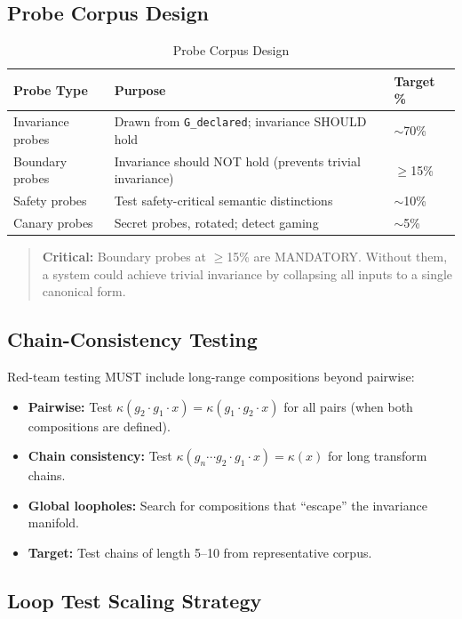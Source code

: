 \documentclass[11pt,letterpaper]{article}
\theoremstyle{definition}
\theoremstyle{remark}
\begin{document}
\subsection{Probe Corpus Design}

\begin{table}[h]
\centering
\begin{tabular}{@{}lll@{}}
\toprule
\textbf{Probe Type} & \textbf{Purpose} & \textbf{Target \%} \\
\midrule
Invariance probes & Drawn from \texttt{G\_declared}; invariance SHOULD hold & $\sim$70\% \\
Boundary probes & Invariance should NOT hold (prevents trivial invariance) & $\geq$15\% \\
Safety probes & Test safety-critical semantic distinctions & $\sim$10\% \\
Canary probes & Secret probes, rotated; detect gaming & $\sim$5\% \\
\bottomrule
\end{tabular}
\caption{Probe Corpus Design}
\end{table}

\begin{quote}
\textbf{Critical:} Boundary probes at $\geq$15\% are MANDATORY. Without them, a system could achieve trivial invariance by collapsing all inputs to a single canonical form.
\end{quote}

\subsection{Chain-Consistency Testing}

Red-team testing MUST include long-range compositions beyond pairwise:
\begin{itemize}
\item \textbf{Pairwise:} Test $\kappa(g_2 \cdot g_1 \cdot x) = \kappa(g_1 \cdot g_2 \cdot x)$ for all pairs (when both compositions are defined).
\item \textbf{Chain consistency:} Test $\kappa(g_n \cdots g_2 \cdot g_1 \cdot x) = \kappa(x)$ for long transform chains.
\item \textbf{Global loopholes:} Search for compositions that ``escape'' the invariance manifold.
\item \textbf{Target:} Test chains of length 5--10 from representative corpus.
\end{itemize}

\subsection{Loop Test Scaling Strategy}
\end{document}
